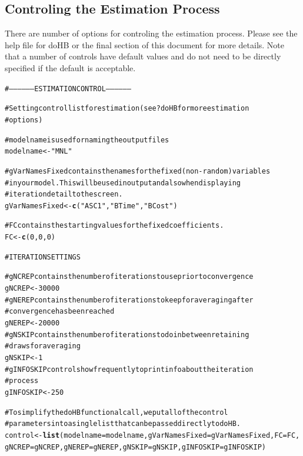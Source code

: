 \documentclass{article}\usepackage{graphicx, color}
\makeatletter
\newcommand{\hlfunctioncall}[1]{\textcolor[rgb]{0.501960784313725,0,0.329411764705882}{\textbf{#1}}}%
\newcommand{\hlstring}[1]{\textcolor[rgb]{0.6,0.6,1}{#1}}%
\newcommand{\hlcomment}[1]{\textcolor[rgb]{0.180392156862745,0.6,0.341176470588235}{#1}}%
\newenvironment{kframe}{%
 \def\at@end@of@kframe{}%
 \ifinner\ifhmode%
  \def\at@end@of@kframe{\end{minipage}}%
  \begin{minipage}{\columnwidth}%
 \fi\fi%
 \def\FrameCommand##1{\hskip\@totalleftmargin \hskip-\fboxsep
 \colorbox{shadecolor}{##1}\hskip-\fboxsep
     \hskip-\linewidth \hskip-\@totalleftmargin \hskip\columnwidth}%
 \MakeFramed {\advance\hsize-\width
   \@totalleftmargin\z@ \linewidth\hsize
   \@setminipage}}%
 {\par\unskip\endMakeFramed%
 \at@end@of@kframe}
\newenvironment{knitrout}{}{} %
\makeatother
\begin{document}
\subsection*{Controling the Estimation Process}

There are number of options for controling the estimation process. Please see the help file for doHB or the final section of this document for more details. Note that a number of controls have default values and do not need to be directly specified if the default is acceptable.

\begin{knitrout}
\color{fgcolor}\begin{kframe}
\begin{alltt}

\hlcomment{# ------------------ ESTIMATION CONTROL ------------------}

\hlcomment{# Setting control list for estimation (see ?doHB for more estimation}
\hlcomment{# options)}

\hlcomment{# modelname is used for naming the output files}
modelname <- \hlstring{"MNL"}

\hlcomment{# gVarNamesFixed contains the names for the fixed (non-random) variables}
\hlcomment{# in your model. This will be used in output and also when displaying}
\hlcomment{# iteration detail to the screen.}
gVarNamesFixed <- \hlfunctioncall{c}(\hlstring{"ASC1"}, \hlstring{"BTime"}, \hlstring{"BCost"})

\hlcomment{# FC contains the starting values for the fixed coefficients.}
FC <- \hlfunctioncall{c}(0, 0, 0)

\hlcomment{# ITERATION SETTINGS}

\hlcomment{# gNCREP contains the number of iterations to use prior to convergence}
gNCREP <- 30000
\hlcomment{# gNEREP contains the number of iterations to keep for averaging after}
\hlcomment{# convergence has been reached}
gNEREP <- 20000
\hlcomment{# gNSKIP contains the number of iterations to do in between retaining}
\hlcomment{# draws for averaging}
gNSKIP <- 1
\hlcomment{# gINFOSKIP controls how frequently to print info about the iteration}
\hlcomment{# process}
gINFOSKIP <- 250

\hlcomment{# To simplify the doHB functional call, we put all of the control}
\hlcomment{# parameters into a single list that can be passed directly to doHB.}
control <- \hlfunctioncall{list}(modelname = modelname, gVarNamesFixed = gVarNamesFixed, FC = FC, 
    gNCREP = gNCREP, gNEREP = gNEREP, gNSKIP = gNSKIP, gINFOSKIP = gINFOSKIP)
\end{alltt}
\end{kframe}
\end{knitrout}
\end{document}
